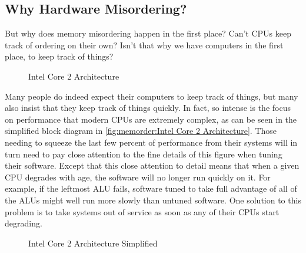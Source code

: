 \subsection{Why Hardware Misordering?}
\label{sec:memorder:Why Hardware Misordering?}

But why does memory misordering happen in the first place?
Can't CPUs keep track of ordering on their own?
Isn't that why we have computers in the first place, to keep track of things?

\begin{figure}
\centering
{}
\caption{Intel Core 2 Architecture}
\end{figure}

Many people do indeed expect their computers to keep track of things,
but many also insist that they keep track of things quickly.
In fact, so intense is the focus on performance that modern CPUs
are extremely complex, as can be seen in the simplified block diagram in
\cref{fig:memorder:Intel Core 2 Architecture}.
Those needing to squeeze the last few percent of performance from their
systems will in turn need to pay close attention to the fine details of this
figure when tuning their software.
Except that this close attention to detail means that when a given CPU
degrades with age, the software will no longer run quickly on it.
For example, if the leftmost ALU fails, software tuned to take full
advantage of all of the ALUs might well run more slowly than untuned
software.
One solution to this problem is to take systems out of service as soon
as any of their CPUs start degrading.

\begin{figure}
\centering
{}
\caption{Intel Core 2 Architecture Simplified}
\end{figure}


